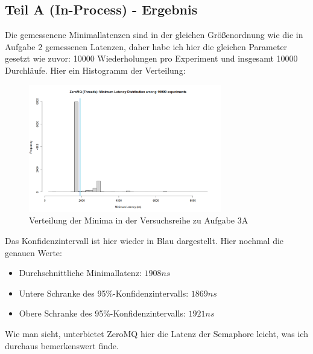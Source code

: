 \documentclass[12pt]{article}
\begin{document}
\subsection{Teil A (In-Process) - Ergebnis}
Die gemessenene Minimallatenzen sind in der gleichen Größenordnung wie die in Aufgabe 2 gemessenen Latenzen, daher habe ich hier die gleichen Parameter gesetzt wie zuvor: 10000 Wiederholungen pro Experiment und insgesamt 10000 Durchläufe. Hier ein Histogramm der Verteilung:

\begin{figure}[H]
	\centering
	\includegraphics[width=0.75\textwidth]{./img/zeromq_inproc}
	\caption{Verteilung der Minima in der Versuchsreihe zu Aufgabe 3A}
	\label{img:zeromq:inproc}
\end{figure}

Das Konfidenzintervall ist hier wieder in Blau dargestellt.
Hier nochmal die genauen Werte:
\begin{itemize}
	\item Durchschnittliche Minimallatenz: $1908 ns$
	\item Untere Schranke des 95\%-Konfidenzintervalls: $1869 ns$
	\item Obere Schranke des 95\%-Konfidenzintervalls: $1921 ns$
\end{itemize}

Wie man sieht, unterbietet ZeroMQ hier die Latenz der Semaphore leicht, was ich durchaus bemerkenswert finde.
\end{document}
